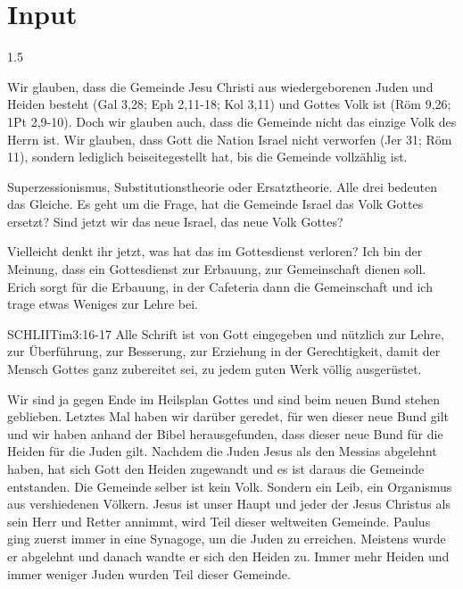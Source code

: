 \documentclass[fontsize=14pt]{../../inc/mybib}
\begin{document}
\section{Input}
\begin{spacing}{1.5}
    \begin{block}[Glaubensbekenntnis]
        Wir glauben, dass die Gemeinde Jesu Christi aus wiedergeborenen Juden und Heiden besteht (Gal 3,28; Eph 2,11-18; Kol 3,11) und Gottes Volk ist (Röm 9,26; 1Pt 2,9-10). Doch wir glauben auch, dass die Gemeinde nicht das einzige Volk des Herrn ist. Wir glauben, dass Gott die Nation Israel nicht verworfen (Jer 31; Röm 11), sondern lediglich beiseitegestellt hat, bis die Gemeinde vollzählig ist.
    \end{block}
    \begin{block}[Definition]
        Superzessionismus, Substitutionstheorie oder Ersatztheorie. Alle drei bedeuten das Gleiche. Es geht um die Frage, hat die Gemeinde Israel das Volk Gottes ersetzt? Sind jetzt wir das neue Israel, das neue Volk Gottes?

        Vielleicht denkt ihr jetzt, was hat das im Gottesdienst verloren? Ich bin der Meinung, dass ein Gottesdienst zur Erbauung, zur Gemeinschaft  dienen soll. Erich sorgt für die Erbauung, in der Cafeteria dann die Gemeinschaft und ich trage etwas Weniges zur Lehre bei. 
        \begin{bibelbox}{SCHL}{IITim}{3:16-17}
        Alle Schrift ist von Gott eingegeben und nützlich zur Lehre, zur Überführung, zur Besserung, zur Erziehung in der Gerechtigkeit, damit der Mensch Gottes ganz zubereitet sei, zu jedem guten Werk völlig ausgerüstet.
        \end{bibelbox}
    \end{block}
    \begin{block}    
        Wir sind ja gegen Ende im Heilsplan Gottes und sind beim neuen Bund stehen geblieben. Letztes Mal haben wir darüber geredet, für wen dieser neue Bund gilt und wir haben anhand der Bibel herausgefunden, dass dieser neue Bund für die Heiden  für die Juden gilt. Nachdem die Juden Jesus als den Messias abgelehnt haben, hat sich Gott den Heiden zugewandt und es ist daraus die Gemeinde entstanden. Die Gemeinde selber ist kein Volk. Sondern ein Leib, ein Organismus aus vershiedenen Völkern. Jesus ist unser Haupt und jeder der Jesus Christus als sein Herr und Retter annimmt, wird Teil dieser weltweiten Gemeinde. Paulus ging zuerst immer in eine Synagoge, um die Juden zu erreichen. Meistens wurde er abgelehnt und danach wandte er sich den Heiden zu. Immer mehr Heiden und immer weniger Juden wurden Teil dieser Gemeinde.


\end{block}
\end{spacing}
\end{document}
